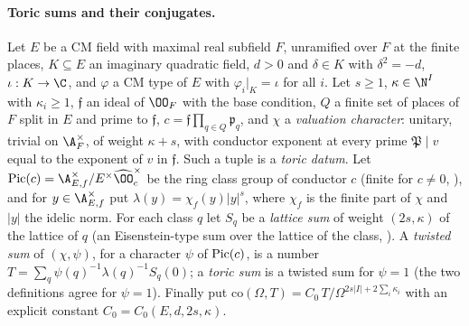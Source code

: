\paragraph{Toric sums and their conjugates.}
Let $E$ be a CM field with maximal real subfield $F$, unramified over $F$ at the finite places, $K\subseteq E$ an imaginary
quadratic field, $d>0$ and $\delta\in K$ with $\delta^2=-d$, $\iota:K\to\C$, and $\varphi$ a CM type of $E$ with
$\varphi_i|_K=\iota$ for all $i$. Let $s\ge1$, $\kappa\in\N^I$ with $\kappa_i\ge1$, $\mathfrak f$ an ideal of $\OO_F$ with the base
condition, $Q$ a finite set of places of $F$ split in $E$ and prime to $\mathfrak f$, $c=\mathfrak f\prod_{q\in Q}\mathfrak p_q$, and
$\chi$ a \emph{valuation character}: unitary, trivial on $\A_F^\times$, of weight $\kappa+s$, with conductor exponent at every prime
$\mathfrak P\mid v$ equal to the exponent of $v$ in $\mathfrak f$. Such a tuple is a \emph{toric datum}. Let
$\shdivPic(c)=\A_{E,f}^\times/E^\times\widehat\OO_c^\times$ be the ring class group of conductor $c$ (finite for $c\ne0$,
), and for $y\in\A_{E,f}^\times$ put $\lambda(y)=\chi_f(y)|y|^s$, where $\chi_f$ is the
finite part of $\chi$ and $|y|$ the idelic norm. For each class $q$ let $S_q$ be a \emph{lattice sum} of weight $(2s,\kappa)$ of the
lattice of $q$ (an Eisenstein-type sum over the lattice of the class, \cite{LeanSource2026}). A \emph{twisted sum} of $(\chi,\psi)$,
for a character $\psi$ of $\operatorname{Pic}(c)$, is a number $T=\sum_q\psi(q)^{-1}\lambda(q)^{-1}S_q(0)$; a \emph{toric sum} is a twisted sum
for $\psi=1$ (the two definitions agree for $\psi=1$). Finally put
$\mathrm{co}(\Omega,T)=C_0\,T/\Omega^{2s|I|+2\sum_i\kappa_i}$ with an explicit constant $C_0=C_0(E,d,2s,\kappa)$.

